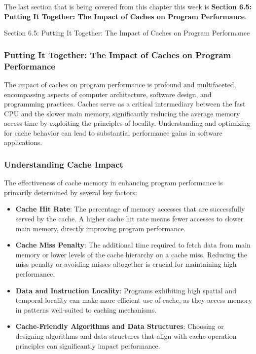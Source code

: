 The last section that is being covered from this chapter this week is \textbf{Section 6.5: Putting It Together: The Impact of Caches on Program Performance}.

\begin{notes}{Section 6.5: Putting It Together: The Impact of Caches on Program Performance}
    \subsubsection*{Putting It Together: The Impact of Caches on Program Performance}

    The impact of caches on program performance is profound and multifaceted, encompassing aspects of computer architecture, software design, and programming practices. Caches serve as a critical 
    intermediary between the fast CPU and the slower main memory, significantly reducing the average memory access time by exploiting the principles of locality. Understanding and optimizing for cache 
    behavior can lead to substantial performance gains in software applications. \vspace*{1em}
    
    \subsubsection*{Understanding Cache Impact}
    
    The effectiveness of cache memory in enhancing program performance is primarily determined by several key factors:
    
    \begin{itemize}
        \item \textbf{Cache Hit Rate}: The percentage of memory accesses that are successfully served by the cache. A higher cache hit rate means fewer accesses to slower main memory, directly 
        improving program performance.
        \item \textbf{Cache Miss Penalty}: The additional time required to fetch data from main memory or lower levels of the cache hierarchy on a cache miss. Reducing the miss penalty or avoiding 
        misses altogether is crucial for maintaining high performance.
        \item \textbf{Data and Instruction Locality}: Programs exhibiting high spatial and temporal locality can make more efficient use of cache, as they access memory in patterns well-suited to 
        caching mechanisms.
        \item \textbf{Cache-Friendly Algorithms and Data Structures}: Choosing or designing algorithms and data structures that align with cache operation principles can significantly impact performance.
    \end{itemize}
    

\end{notes}
